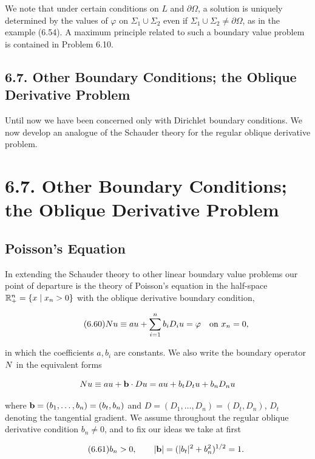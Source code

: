 We note that under certain conditions on $L$ and $\partial\Omega$, a solution is uniquely
determined by the values of $\varphi$ on $\Sigma_1 \cup \Sigma_2$ even if $\Sigma_1 \cup \Sigma_2 \neq \partial\Omega$, as in the example
(6.54). A maximum principle related to such a boundary value problem is contained
in Problem 6.10.

\subsection*{6.7. Other Boundary Conditions; the Oblique Derivative Problem}

Until now we have been concerned only with Dirichlet boundary conditions. We
now develop an analogue of the Schauder theory for the regular oblique derivative
problem.


\section*{6.7. Other Boundary Conditions; the Oblique Derivative Problem}

\subsection*{Poisson's Equation}

In extending the Schauder theory to other linear boundary value problems our
point of departure is the theory of Poisson's equation in the half-space $\mathbb{R}_+^n =
\{x \mid x_n>0\}$ with the oblique derivative boundary condition,

\begin{equation}
\tag{6.60}
N u \equiv a u + \sum_{i=1}^n b_i D_i u = \varphi \quad \text{on } x_n=0,
\end{equation}

in which the coefficients $a, b_i$ are constants. We also write the boundary operator $N$
in the equivalent forms

\[
N u \equiv a u + \mathbf{b} \cdot D u = a u + b_t D_t u + b_n D_n u
\]

where $\mathbf{b} = (b_1,\ldots,b_n) = (b_t,b_n)$ and $D = (D_1,\ldots,D_n) = (D_t,D_n)$, $D_t$ denoting the
tangential gradient. We assume throughout the regular oblique derivative condition
$b_n \neq 0$, and to fix our ideas we take at first

\begin{equation}
\tag{6.61}
b_n>0, \qquad |\mathbf{b}| = (|b_t|^2 + b_n^2)^{1/2}=1.
\end{equation}

